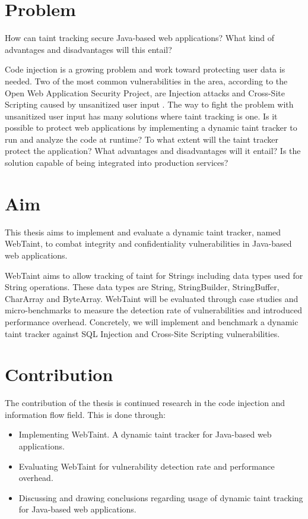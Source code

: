 \section{Problem}
\label{Problem}
\begin{chapquote}{}
    How can taint tracking secure Java-based web applications? What kind of advantages and disadvantages will this entail?
\end{chapquote}

\noindent
Code injection is a growing problem and work toward protecting user data is needed. Two of the most common vulnerabilities in the area, according to the Open Web Application Security Project, are Injection attacks and Cross-Site Scripting caused by unsanitized user input \parencite{OWASP2017}. The way to fight the problem with unsanitized user input has many solutions where taint tracking is one. Is it possible to protect web applications by implementing a dynamic taint tracker to run and analyze the code at runtime? To what extent will the taint tracker protect the application? What advantages and disadvantages will it entail? Is the solution capable of being integrated into production services?



\section{Aim}
\label{Aim}
This thesis aims to implement and evaluate a dynamic taint tracker, named WebTaint, to combat integrity and confidentiality vulnerabilities in Java-based web applications. 

WebTaint aims to allow tracking of taint for Strings including data types used for String operations. These data types are String, StringBuilder, StringBuffer, CharArray and ByteArray. WebTaint will be evaluated through case studies and micro-benchmarks to measure the detection rate of vulnerabilities and introduced performance overhead. Concretely, we will implement and benchmark a dynamic taint tracker against SQL Injection and Cross-Site Scripting vulnerabilities. 



\section{Contribution}
\label{Contribution}
The contribution of the thesis is continued research in the code injection and information flow field. This is done through:

\begin{itemize}  
    \item Implementing WebTaint. A dynamic taint tracker for Java-based web applications.
    \item Evaluating WebTaint for vulnerability detection rate and performance overhead.
    \item Discussing and drawing conclusions regarding usage of dynamic taint tracking for Java-based web applications.
\end{itemize}




